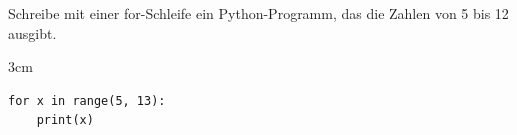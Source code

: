\question[3]
Schreibe mit einer for-Schleife ein Python-Programm, das die Zahlen von 5 bis 12 ausgibt.

\begin{solutionbox}{3cm}
\begin{lstlisting}
for x in range(5, 13):
    print(x)
\end{lstlisting}
\end{solutionbox}